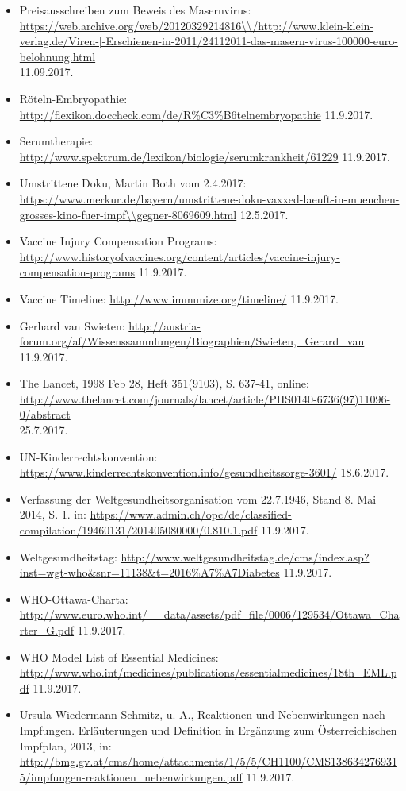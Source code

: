 \documentclass[
    a4paper,
    12pt,
    hyphens,
    chapterprefix=true,
    headheight=33pt,
    footheight=29pt,
    headings=optiontohead,
]{scrartcl}
\begin{document}
{\begin{itemize}
\item{Preisausschreiben zum Beweis des Masernvirus: \url{https://web.archive.org/web/20120329214816\\/http://www.klein-klein-verlag.de/Viren-|-Erschienen-in-2011/24112011-das-masern-virus-100000-euro-belohnung.html} \\11.09.2017.}
\item{Röteln-Embryopathie: \url{http://flexikon.doccheck.com/de/R\%C3\%B6telnembryopathie} 11.9.2017.}
\item{Serumtherapie: \url{http://www.spektrum.de/lexikon/biologie/serumkrankheit/61229} 11.9.2017.}
\item{Umstrittene Doku, Martin Both vom 2.4.2017: \url{https://www.merkur.de/bayern/umstrittene-doku-vaxxed-laeuft-in-muenchen-grosses-kino-fuer-impf\\gegner-8069609.html} 12.5.2017.}
\item{Vaccine Injury Compensation Programs: \url{http://www.historyofvaccines.org/content/articles/vaccine-injury-compensation-programs} 11.9.2017.}
\item{Vaccine Timeline: \url{http://www.immunize.org/timeline/} 11.9.2017.}
\item{Gerhard van Swieten: \url{http://austria-forum.org/af/Wissenssammlungen/Biographien/Swieten,_Gerard_van} 11.9.2017.}
\item{The Lancet, 1998 Feb 28, Heft 351(9103), S. 637-41, online: \url{http://www.thelancet.com/journals/lancet/article/PIIS0140-6736(97)11096-0/abstract}\\ 25.7.2017.}
\item{UN-Kinderrechtskonvention: \url{https://www.kinderrechtskonvention.info/gesundheitssorge-3601/} 18.6.2017.}
\item{Verfassung der Weltgesundheitsorganisation vom 22.7.1946, Stand 8. Mai 2014, S. 1. in: \url{https://www.admin.ch/opc/de/classified-compilation/19460131/201405080000/0.810.1.pdf} 11.9.2017.}
\item{Weltgesundheitstag: \url{http://www.weltgesundheitstag.de/cms/index.asp?inst=wgt-who&snr=11138&t=2016\%A7\%A7Diabetes} 11.9.2017.}
\item{WHO-Ottawa-Charta: \url{http://www.euro.who.int/__data/assets/pdf_file/0006/129534/Ottawa_Charter_G.pdf} 11.9.2017.}
\item{WHO Model List of Essential Medicines: \url{http://www.who.int/medicines/publications/essentialmedicines/18th_EML.pdf} 11.9.2017.}
\item{Ursula Wiedermann-Schmitz, u. A., Reaktionen und Nebenwirkungen nach Impfungen. Erläuterungen und Definition in Ergänzung zum Österreichischen Impfplan, 2013, in: \url{http://bmg.gv.at/cms/home/attachments/1/5/5/CH1100/CMS1386342769315/impfungen-reaktionen_nebenwirkungen.pdf} 11.9.2017.}

\end{itemize}}
\end{document}
